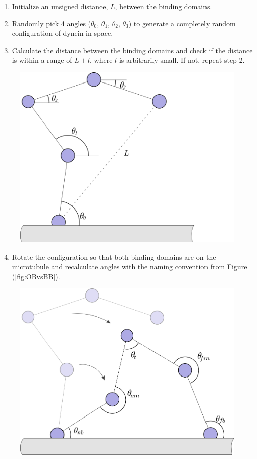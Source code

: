\begin{enumerate}
	\item Initialize an unsigned distance, $L$, between the binding domains.
	
	\item Randomly pick 4 angles ($\theta_0$, $\theta_1$, $\theta_2$, $\theta_3$) to generate a completely random configuration of dynein in space.
	
	\item Calculate the distance between the binding domains and check if the distance is within a range of $L\pm l$, where $l$ is arbitrarily small. If not, repeat step 2.
\end{enumerate}

\begin{figure}[H]
\centering
\includegraphics[width=0.5\columnwidth]{Figures/montecarlo2.png}
\label{fig:mc2}
\end{figure}

\begin{enumerate}
	\setcounter{enumi}{3}
	\item Rotate the configuration so that both binding domains are on the microtubule and recalculate angles with the naming convention from Figure (\ref{fig:OBvsBB}).
\end{enumerate}

\begin{figure}[H]
\centering
\includegraphics[width=0.5\columnwidth]{Figures/montecarlo3.png}
\label{fig:mc3}
\end{figure}

